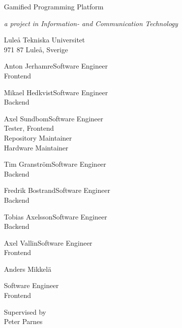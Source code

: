 \begin{center}
    {\LARGE Gamified Programming Platform}\par
    {\large\it a project in Information- and Communication Technology}
    \vspace{\baselineskip}

    {\Large Luleå Tekniska Universitet}\\{\large 971 87 Luleå, Sverige}\par
\end{center}

\vfill

            {Anton Jerhamre}{Software Engineer \\ Frontend}

            {Mikael Hedkvist}{Software Engineer \\ Backend}

            {Axel Sundbom}{Software Engineer \\ Tester, Frontend \\ Repository Maintainer \\ Hardware Maintainer}

            {Tim Granström}{Software Engineer\\ Backend}

            {Fredrik Bostrand}{Software Engineer \\ Backend}

            {Tobias Axelsson}{Software Engineer \\ Backend}

            {Axel Vallin}{Software Engineer \\ Frontend}


\begin{center}
    \begin{member}
    \centering
    Anders Mikkelä\par
        Software Engineer \\
        Frontend
    \end{member}
\end{center}

\vfill

\begin{center}
    Supervised by\\ Peter Parnes
\end{center}
